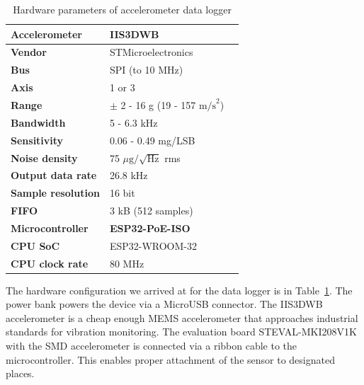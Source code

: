 \begin{table}[h]
\renewcommand{\arraystretch}{1.2}
\centering
\begin{tabular}{|l|l|l|}
\hline
\textbf{Accelerometer}                   & \textbf{IIS3DWB}   \\ \hline
\textbf{Vendor}                          & STMicroelectronics \\ \hline
\textbf{Bus}                             & SPI  (to 10 MHz)               \\ \hline
\textbf{Axis}                            & 1 or 3             \\ \hline
\textbf{Range}                           & $\pm$ 2 - 16 g (19 - 157 $\mathrm{m/s}^2$)   \\ \hline
\textbf{Bandwidth}                       & 5 - 6.3 kHz           \\ \hline
\textbf{Sensitivity}                     & 0.06 - 0.49 mg/LSB      \\ \hline
\textbf{Noise density} & 75 $\mu \mathrm{g} / \sqrt{\mathrm{Hz}}$ rms                \\ \hline
\textbf{Output data rate}               & 26.8 kHz             \\ \hline
\textbf{Sample resolution}              & 16 bit                 \\ \hline
\textbf{FIFO}                           & 3 kB (512 samples) \\ \hline
\textbf{Microcontroller}                & \textbf{ESP32-PoE-ISO}      \\ \hline
\textbf{CPU SoC}                                 & ESP32-WROOM-32     \\ \hline
\textbf{CPU clock rate}                          & 80 MHz     \\ \hline
\end{tabular}
\caption{Hardware parameters of accelerometer data logger}
\label{tab:design:hw-sensors}
\end{table}

The hardware configuration we arrived at for the data logger is in Table~\ref{tab:design:hw-sensors}. The power bank powers the device via a MicroUSB connector. The IIS3DWB accelerometer is a cheap enough MEMS accelerometer that approaches industrial standards for vibration monitoring. The evaluation board STEVAL-MKI208V1K with the SMD accelerometer is connected via a ribbon cable to the microcontroller. This enables proper attachment of the sensor to designated places.

